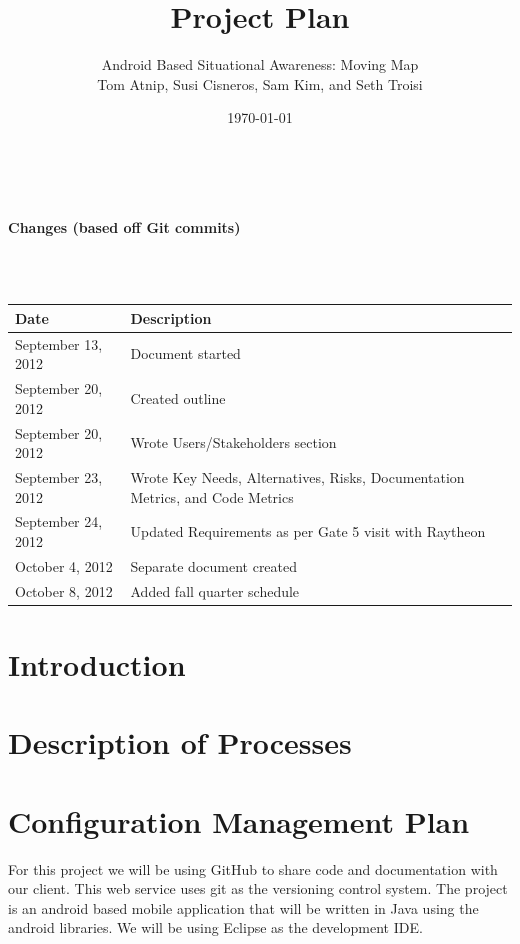 \documentclass{article}
\begin{document}
\setlength{\voffset}{3.5in}
\title{Project Plan}
\author{\Large Android Based Situational Awareness: Moving Map\\
Tom Atnip, Susi Cisneros, Sam Kim, and Seth Troisi}
\date{\today}
\maketitle
\clearpage
\setlength{\voffset}{0pt}
\tableofcontents
\clearpage
~\\
\begin{Large}\textbf{Changes (based off Git commits)}\end{Large}\\
~\\
\begin{tabular}{ | p{1.5in} | p{4.5in} | }
\hline
\textbf{Date} & \textbf{Description}\\
\hline
\hline
September 13, 2012 & Document started\\
\hline
September 20, 2012 & Created outline\\
\hline
September 20, 2012 & Wrote Users/Stakeholders section\\
\hline
September 23, 2012 & Wrote Key Needs, Alternatives, Risks, Documentation Metrics, and Code Metrics\\
\hline
September 24, 2012 & Updated Requirements as per Gate 5 visit with Raytheon\\
\hline
October 4, 2012 & Separate document created\\
\hline
October 8, 2012 & Added fall quarter schedule\\
\hline
\end{tabular}
\clearpage

\section{Introduction}
\section{Description of Processes}
\section{Configuration Management Plan}
For this project we will be using GitHub to share code and documentation with our client. This web service uses git as the versioning control system. The project is an android based mobile application that will be written in Java using the android libraries.  We will be using Eclipse as the development IDE.\\
\end{document}
